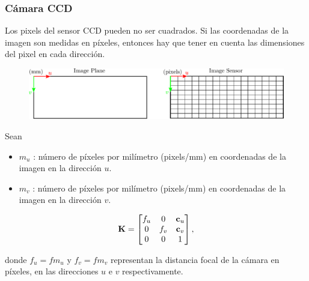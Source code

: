 \begin{frame}
    \frametitle{Cámara CCD}
    \footnotesize
    
    Los pixels del sensor CCD pueden no ser cuadrados. Si las coordenadas de la imagen son medidas en píxeles, entonces hay que tener en cuenta las dimensiones del pixel en cada dirección.
    
    \begin{figure}[!h]
        \centering
        \includegraphics[width=0.6\columnwidth]{images/camera/rectangular_pixels.pdf}
    \end{figure}


    Sean
    \begin{itemize}
        \item $m_{u}$ : número de píxeles por milímetro (pixels/mm) en coordenadas de la
        imagen en la dirección $u$.
        \item $m_{v}$ : número de píxeles por milímetro (pixels/mm) en coordenadas de
        la imagen en la dirección $v$.
    \end{itemize}

    \begin{equation*}
        \boldsymbol{\mathbf{K}}=
        \begin{bmatrix}f_{u} & 0 & \boldsymbol{\mathbf{c}}_{u}\\
            0 & f_{v} & \boldsymbol{\mathbf{c}}_{v}\\
            0 & 0 & 1
        \end{bmatrix},
    \end{equation*}

    donde $f_{u} = f m_{u} $ y $f_{v} = f m_{v}$ representan la distancia focal de la cámara en píxeles, en las direcciones $u$ e $v$ respectivamente.
\end{frame}

